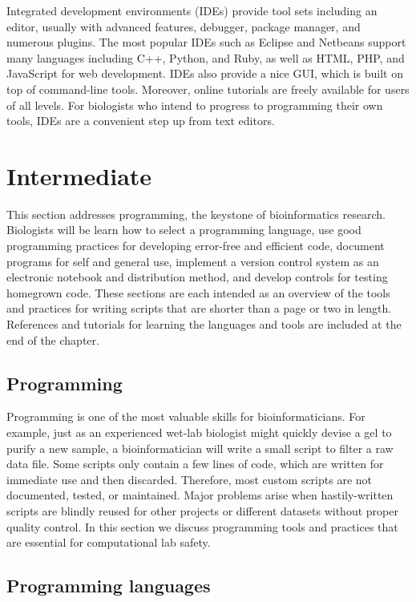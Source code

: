 \documentclass[ChapterTOCs,krantz2]{krantz} %
\begin{document}
Integrated development environments (IDEs) provide tool sets
including an editor, usually with advanced features, debugger, package manager,
and numerous plugins. The most popular IDEs such as 
Eclipse and Netbeans support many languages including
C++, Python, and Ruby, as well as HTML, PHP, and JavaScript for web
development. IDEs also provide a nice GUI, which is built on
top of command-line tools.  Moreover, 
online tutorials are freely available for users of all levels.  For biologists who 
intend to progress to programming their own tools, IDEs are a convenient step 
up from text editors.

\section{Intermediate} This section addresses programming, the keystone of
bioinformatics research.  Biologists will be learn how to 
select a programming language, use good programming practices for
developing error-free and efficient code, document programs for self and
general use, implement a version control system as an electronic notebook
and distribution method, and develop controls for testing homegrown code.  These
sections are each intended as an overview of the tools and practices for
writing scripts that are shorter than a page or two in length.  References and
tutorials for learning the languages and tools are included at the end of the
chapter. 

\subsection{Programming} Programming is one of the most valuable skills for 
bioinformaticians. For example, just
as an experienced wet-lab biologist might quickly devise a gel to
purify a new sample, a bioinformatician will write a small
script to filter a raw data file. Some scripts only contain a few
lines of code, which are written for immediate use and then discarded.  
Therefore, most custom scripts are not documented, tested, or 
maintained.  Major problems arise when hastily-written scripts are blindly
reused for other projects or different datasets without proper quality control.  In
this section we discuss programming tools and practices that are 
essential for computational lab safety. 

\subsection{Programming languages}
\end{document}

